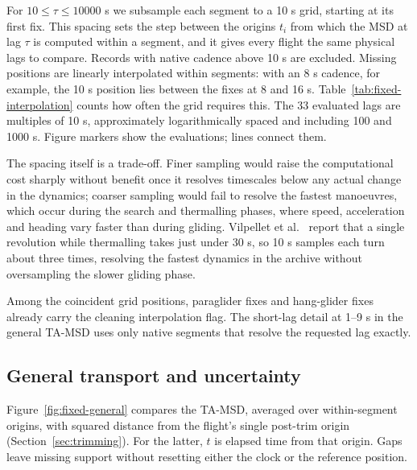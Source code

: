 For $10\leq\tau\leq10000$ s we subsample each segment to a 10 s grid, starting at its
first fix. This spacing sets the step between the origins $t_i$ from which the MSD
at lag $\tau$ is computed within a segment, and it gives every flight the same
physical lags to compare. Records with native cadence above 10 s are excluded.
Missing positions are linearly interpolated within segments: with an 8 s cadence,
for example, the 10 s position lies between the fixes at 8 and 16 s.
Table~\ref{tab:fixed-interpolation} counts how often the grid requires this. The 33
evaluated lags are multiples of 10 s, approximately logarithmically spaced and
including 100 and 1000 s. Figure markers show the evaluations; lines connect them.

The spacing itself is a trade-off. Finer sampling would raise the computational cost
sharply without benefit once it resolves timescales below any actual change in the
dynamics; coarser sampling would fail to resolve the fastest manoeuvres, which occur
during the search and thermalling phases, where speed, acceleration and heading vary
faster than during gliding. Vilpellet et al.~\cite{vilpellet2026} report that a
single revolution while thermalling takes just under 30 s, so 10 s samples each turn
about three times, resolving the fastest dynamics in the archive without
oversampling the slower gliding phase.

\begin{table}[htbp]
 \centering\small
 
 \caption{Common-grid positions in the main fixed cohort. Coincidence is checked
 against actual cleaned timestamps. The last two columns count interpolation added
 by the 10 s grid, separately from reconstruction during cleaning.}
 \label{tab:fixed-interpolation}
\end{table}
Among the coincident grid positions, \ChThreeParaPriorInterp{} paraglider fixes and
\ChThreeHangPriorInterp{} hang-glider fixes already carry the cleaning interpolation
flag. The short-lag detail at 1--9 s in the general TA-MSD uses only native segments that
resolve the requested lag exactly.

\subsection{General transport and uncertainty}
\label{sec:fixed-general}

Figure~\ref{fig:fixed-general} compares the TA-MSD, averaged over within-segment
origins, with squared distance from the flight's single post-trim origin
(Section~\ref{sec:trimming}). For the latter, $t$ is elapsed time from that origin.
Gaps leave missing support without resetting either the clock or the reference
position.

